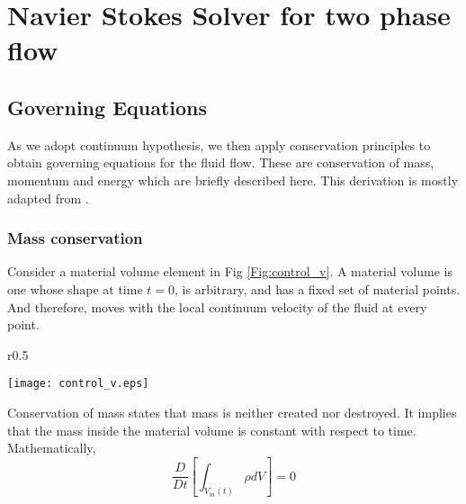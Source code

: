 % 

% 
% 
\chapter{Navier Stokes Solver for two phase flow}
% 
\section{Governing Equations}
As we adopt continuum hypothesis, we then apply conservation principles to obtain governing equations for 
the fluid flow. These are conservation of mass, momentum and energy which are briefly described here. This derivation
is mostly adapted from \cite{Leal2007}.

\subsection{Mass conservation}
Consider a material volume element in Fig \ref{Fig:control_v}.  A material volume is one whose shape at time $t=0$, is arbitrary,
and has a fixed set of material points. And therefore, moves with the local continuum velocity of the fluid 
at every point.

\begin{wrapfigure}{r}{0.5\textwidth}
  \begin{center}
    \texttt{[image: control\_v.eps]}
  \end{center}
  \caption{An arbitrary control volume \cite{Leal2007}}
  \label{Fig:control_v}
\end{wrapfigure}

Conservation of mass states that mass is neither created nor destroyed. It implies that the mass inside the material volume is constant with respect
to time. Mathematically,
\begin{equation}
 \frac{D}{Dt}\left[\int_{V_m(t)}{\rho dV}\right] = 0 
 \label{Eq:1}
\end{equation}

